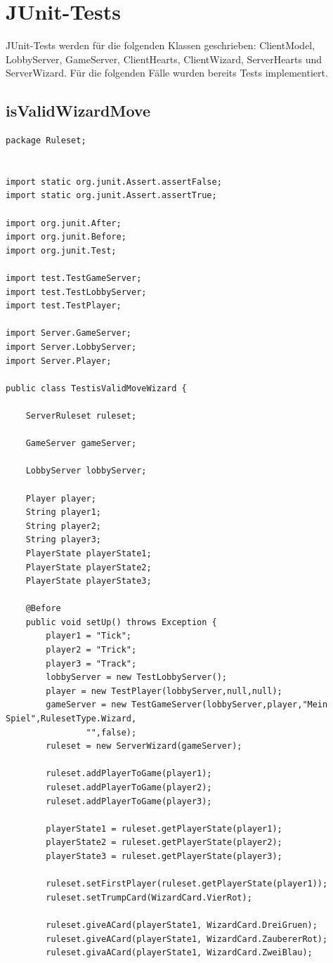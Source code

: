 \documentclass[twoside]{article}
\begin{document}
\section{JUnit-Tests}
JUnit-Tests werden für die folgenden Klassen geschrieben: ClientModel, LobbyServer,
GameServer, ClientHearts, ClientWizard, ServerHearts und ServerWizard. Für die folgenden Fälle wurden bereits Tests implementiert.

\subsection{isValidWizardMove}
\begin{lstlisting}
package Ruleset;


import static org.junit.Assert.assertFalse;
import static org.junit.Assert.assertTrue;

import org.junit.After;
import org.junit.Before;
import org.junit.Test;

import test.TestGameServer;
import test.TestLobbyServer;
import test.TestPlayer;

import Server.GameServer;
import Server.LobbyServer;
import Server.Player;

public class TestisValidMoveWizard {
	
	ServerRuleset ruleset;
	
	GameServer gameServer;
	
	LobbyServer lobbyServer;
	
	Player player;
	String player1;
	String player2;
	String player3;
	PlayerState playerState1;
	PlayerState playerState2;
	PlayerState playerState3;
	
	@Before
	public void setUp() throws Exception {
		player1 = "Tick";
		player2 = "Trick";
		player3 = "Track";
		lobbyServer = new TestLobbyServer();
		player = new TestPlayer(lobbyServer,null,null);
		gameServer = new TestGameServer(lobbyServer,player,"Mein Spiel",RulesetType.Wizard, 
				"",false);
		ruleset = new ServerWizard(gameServer);
		
		ruleset.addPlayerToGame(player1);
		ruleset.addPlayerToGame(player2);
		ruleset.addPlayerToGame(player3);
		
		playerState1 = ruleset.getPlayerState(player1);
		playerState2 = ruleset.getPlayerState(player2);
		playerState3 = ruleset.getPlayerState(player3);
		
		ruleset.setFirstPlayer(ruleset.getPlayerState(player1));
		ruleset.setTrumpCard(WizardCard.VierRot);
		
		ruleset.giveACard(playerState1, WizardCard.DreiGruen);
		ruleset.giveACard(playerState1, WizardCard.ZaubererRot);
		ruleset.givaACard(playerState1, WizardCard.ZweiBlau);
		

\end{lstlisting}
\end{document}
